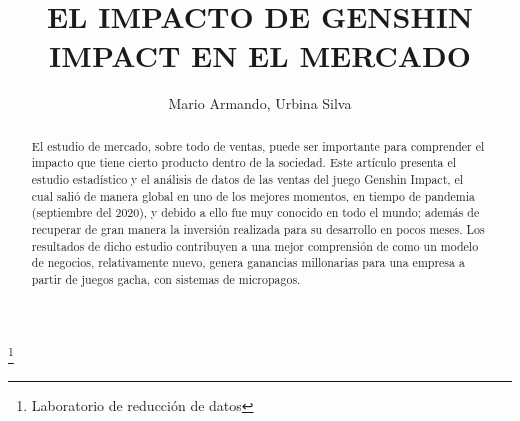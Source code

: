 \documentclass[osajnl,twocolumn,showpacs,superscriptaddress,10pt]{revtex4-2}
\begin{document}
\providecommand{\sumat}[3]{\ensuremath{\sum_{#1}^{#2}{\left\{\hspace{2pt} #3 \hspace{2pt}\right\}}}}
\providecommand{\suma}[3]{\ensuremath{\sum_{#1}^{#2}{#3}}}
\providecommand{\Rarr}[1]{\ensuremath{\hs{#1}\Longrightarrow\hs{#1}}}
\providecommand{\rarr}[1]{\ensuremath{\hs{#1}\longrightarrow\hs{#1}}}

\providecommand{\expo}[1]{\ensuremath{e^{#1}}}
\providecommand{\uvec}[1]{\ensuremath{\hat{#1}}}

\title{EL IMPACTO DE GENSHIN IMPACT EN EL MERCADO}
\thanks{Laboratorio de reducción de datos}

\author{Mario Armando, Urbina Silva}
%
\begin{abstract}
    El estudio de mercado, sobre todo de ventas, puede ser importante para comprender el impacto que tiene cierto producto dentro de la sociedad. Este artículo presenta el estudio estadístico y el análisis de datos de las ventas del juego Genshin Impact, el cual salió de manera global en uno de los mejores momentos, en tiempo de pandemia (septiembre del 2020), y debido a ello fue muy conocido en todo el mundo; además de recuperar de gran manera la inversión realizada para su desarrollo en pocos meses. Los resultados de dicho estudio contribuyen a una mejor comprensión de como un modelo de negocios, relativamente nuevo, genera ganancias millonarias para una empresa a partir de juegos gacha, con sistemas de micropagos.
\end{abstract}
\maketitle
\end{document}
